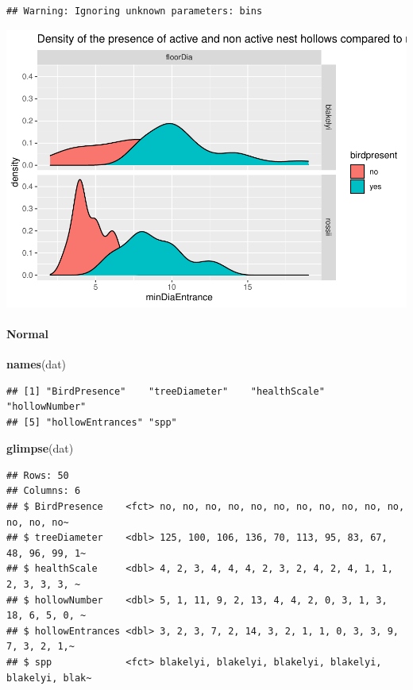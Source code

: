 \documentclass[utf8]{frontiersSCNS}
\newenvironment{Shaded}{\begin{snugshade}}{\end{snugshade}}
\newcommand{\KeywordTok}[1]{\textcolor[rgb]{0.13,0.29,0.53}{\textbf{#1}}}
\newcommand{\NormalTok}[1]{#1}
\begin{document}
\begin{verbatim}
## Warning: Ignoring unknown parameters: bins
\end{verbatim}

\includegraphics{demoReport_files/figure-latex/unnamed-chunk-2-1.pdf}

\hypertarget{normal}{%
\paragraph{Normal}\label{normal}}

\begin{Shaded}
\begin{Highlighting}[]
\KeywordTok{names}\NormalTok{(dat)}
\end{Highlighting}
\end{Shaded}

\begin{verbatim}
## [1] "BirdPresence"    "treeDiameter"    "healthScale"     "hollowNumber"   
## [5] "hollowEntrances" "spp"
\end{verbatim}

\begin{Shaded}
\begin{Highlighting}[]
\KeywordTok{glimpse}\NormalTok{(dat)}
\end{Highlighting}
\end{Shaded}

\begin{verbatim}
## Rows: 50
## Columns: 6
## $ BirdPresence    <fct> no, no, no, no, no, no, no, no, no, no, no, no, no, no~
## $ treeDiameter    <dbl> 125, 100, 106, 136, 70, 113, 95, 83, 67, 48, 96, 99, 1~
## $ healthScale     <dbl> 4, 2, 3, 4, 4, 4, 2, 3, 2, 4, 2, 4, 1, 1, 2, 3, 3, 3, ~
## $ hollowNumber    <dbl> 5, 1, 11, 9, 2, 13, 4, 4, 2, 0, 3, 1, 3, 18, 6, 5, 0, ~
## $ hollowEntrances <dbl> 3, 2, 3, 7, 2, 14, 3, 2, 1, 1, 0, 3, 3, 9, 7, 3, 2, 1,~
## $ spp             <fct> blakelyi, blakelyi, blakelyi, blakelyi, blakelyi, blak~
\end{verbatim}
\end{document}
